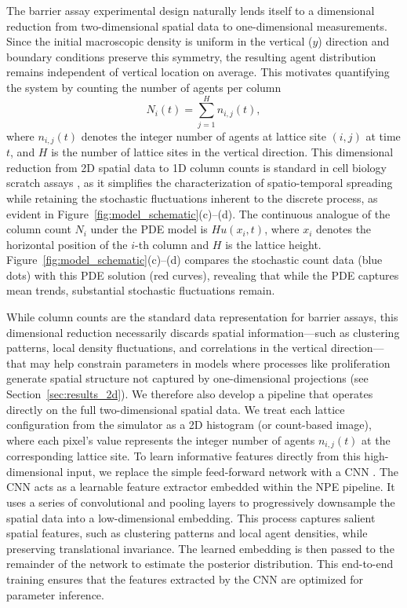 \documentclass{article}
\begin{document}
The barrier assay experimental design naturally lends itself to a dimensional reduction from two-dimensional spatial data to one-dimensional measurements. Since the initial macroscopic density is uniform in the vertical ($y$) direction and boundary conditions preserve this symmetry, the resulting agent distribution remains independent of vertical location on average. This motivates quantifying the system by counting the number of agents per column
\begin{equation}
	N_i(t) = \sum_{j=1}^{H} n_{i,j}(t),
\end{equation}
where $n_{i,j}(t)$ denotes the integer number of agents at lattice site $(i,j)$ at time $t$, and $H$ is the number of lattice sites in the vertical direction. This dimensional reduction from 2D spatial data to 1D column counts is standard in cell biology scratch assays \citep{Jin2016ScratchRepro}, as it simplifies the characterization of spatio-temporal spreading while retaining the stochastic fluctuations inherent to the discrete process, as evident in Figure~\ref{fig:model_schematic}(c)--(d). The continuous analogue of the column count $N_i$ under the PDE model is $Hu(x_i,t)$, where $x_i$ denotes the horizontal position of the $i$-th column and $H$ is the lattice height. Figure~\ref{fig:model_schematic}(c)--(d) compares the stochastic count data (blue dots) with this PDE solution (red curves), revealing that while the PDE captures mean trends, substantial stochastic fluctuations remain.

While column counts are the standard data representation for barrier assays, this dimensional reduction necessarily discards spatial information---such as clustering patterns, local density fluctuations, and correlations in the vertical direction---that may help constrain parameters in models where processes like proliferation generate spatial structure not captured by one-dimensional projections (see Section~\ref{sec:results_2d}). We therefore also develop a pipeline that operates directly on the full two-dimensional spatial data. We treat each lattice configuration from the simulator as a 2D histogram (or count-based image), where each pixel's value represents the integer number of agents $n_{i,j}(t)$ at the corresponding lattice site. To learn informative features directly from this high-dimensional input, we replace the simple feed-forward network with a CNN \citep{lecun1998,krizhevsky2012,goodfellow2016}. The CNN acts as a learnable feature extractor embedded within the NPE pipeline. It uses a series of convolutional and pooling layers to progressively downsample the spatial data into a low-dimensional embedding. This process captures salient spatial features, such as clustering patterns and local agent densities, while preserving translational invariance. The learned embedding is then passed to the remainder of the network to estimate the posterior distribution. This end-to-end training ensures that the features extracted by the CNN are optimized for parameter inference.
\end{document}
